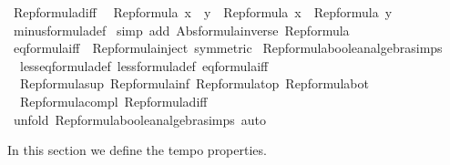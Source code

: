 \begin{isabellebody}
%
\endisadelimproof
\isanewline
{}\isamarkupfalse%
\ Rep{\isacharunderscore}formula{\isacharunderscore}diff{\isacharcolon}\isanewline
\ \ {\isachardoublequoteopen}Rep{\isacharunderscore}formula\ {\isacharparenleft}x\ {\isacharminus}\ y{\isacharparenright}\ {\isacharequal}\ Rep{\isacharunderscore}formula\ x\ {\isacharminus}\ Rep{\isacharunderscore}formula\ y{\isachardoublequoteclose}\isanewline
%
\isadelimproof
%
\endisadelimproof
%
\isatagproof
{}\isamarkupfalse%
\ minus{\isacharunderscore}formula{\isacharunderscore}def\isanewline
{}\isamarkupfalse%
\ {\isacharparenleft}simp\ add{\isacharcolon}\ Abs{\isacharunderscore}formula{\isacharunderscore}inverse\ Rep{\isacharunderscore}formula{\isacharparenright}%
\endisatagproof
{\isafoldproof}%
%
\isadelimproof
\isanewline
%
\endisadelimproof
\isanewline
{}\isamarkupfalse%
\ eq{\isacharunderscore}formula{\isacharunderscore}iff\ {\isacharequal}\ Rep{\isacharunderscore}formula{\isacharunderscore}inject\ {\isacharbrackleft}symmetric{\isacharbrackright}\isanewline
\isanewline
{}\isamarkupfalse%
\ Rep{\isacharunderscore}formula{\isacharunderscore}boolean{\isacharunderscore}algebra{\isacharunderscore}simps\ {\isacharequal}\isanewline
\ \ less{\isacharunderscore}eq{\isacharunderscore}formula{\isacharunderscore}def\ less{\isacharunderscore}formula{\isacharunderscore}def\ eq{\isacharunderscore}formula{\isacharunderscore}iff\isanewline
\ \ Rep{\isacharunderscore}formula{\isacharunderscore}sup\ Rep{\isacharunderscore}formula{\isacharunderscore}inf\ Rep{\isacharunderscore}formula{\isacharunderscore}top\ Rep{\isacharunderscore}formula{\isacharunderscore}bot\isanewline
\ \ Rep{\isacharunderscore}formula{\isacharunderscore}compl\ Rep{\isacharunderscore}formula{\isacharunderscore}diff\ \isanewline
\ \ \isanewline
{}\isamarkupfalse%
%
\isadelimproof
\ %
\endisadelimproof
%
\isatagproof
{}\isamarkupfalse%
\isanewline
{}\isamarkupfalse%
\ {\isacharparenleft}unfold\ Rep{\isacharunderscore}formula{\isacharunderscore}boolean{\isacharunderscore}algebra{\isacharunderscore}simps{\isacharcomma}\ auto{\isacharparenright}%
\endisatagproof
{\isafoldproof}%
%
\isadelimproof
%
\endisadelimproof
\isanewline
{}\isamarkupfalse%
\isanewline
%
\isamarkuptrue%
%
\begin{isamarkuptext}%
In this section we define the tempo properties.%
\end{isamarkuptext}\isamarkuptrue%
%
\begin{isamarkuptext}%

\end{isamarkuptext}
\end{isabellebody}
